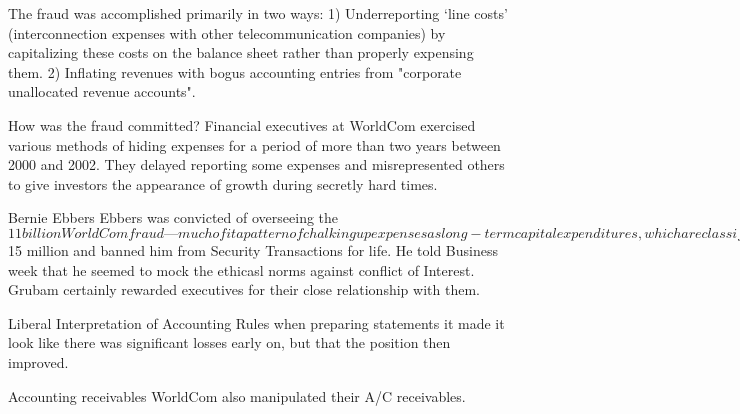 The fraud was accomplished primarily in two ways:
1) Underreporting ‘line costs’ (interconnection expenses with other telecommunication companies) by capitalizing these costs on the balance sheet rather than properly expensing them.
2) Inflating revenues with bogus accounting entries from "corporate unallocated revenue accounts".





How was the fraud committed?
Financial executives at WorldCom exercised various methods of hiding expenses for a period of more than two years between 2000 and 2002. They delayed reporting some expenses and misrepresented others to give investors the appearance of growth during secretly hard times.
 

Bernie Ebbers
Ebbers was convicted of overseeing the $11 billion WorldCom fraud — much of it a pattern of chalking up expenses as long-term capital expenditures, which are classified as assets.




Jack Grubman
SEC fiend him with $15 million and banned him from Security Transactions for life.
He told Business week that he seemed to mock the ethicasl norms against conflict of Interest.
Grubam certainly rewarded executives for their close relationship with them.


Liberal Interpretation of Accounting Rules when preparing statements
it made it look like there was significant losses early on, but that the position then improved.

Accounting receivables
WorldCom also manipulated their A/C receivables.
